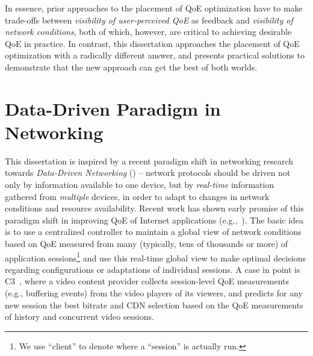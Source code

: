 \begin{itemize}
\end{itemize}

In essence, prior approaches to the placement of QoE optimization have to 
make trade-offs between
{\em visibility of user-perceived QoE} as feedback and {\em visibility of network conditions}, 
both of which, however, are critical to achieving desirable QoE in practice. 
In contrast, this dissertation approaches the placement of QoE optimization with a radically
different answer, and presents practical solutions to demonstrate that the new approach 
can get the best of both worlds.


\section{Data-Driven Paradigm in Networking}

This dissertation is inspired by a recent paradigm shift in networking research 
towards {\em Data-Driven Networking} ({\em \ddn}) -- network protocols should 
be driven not only by information available to one device, but by {\em real-time} 
information gathered from {\em multiple} devices, in order to adapt to changes 
in network conditions and resource availability.
Recent work has shown early promise of this paradigm shift in improving QoE of 
Internet applications (e.g.,~\cite{sigcomm12,footprint}).
The basic idea is to use a centralized controller to maintain a global view of 
network conditions based on QoE measured from many (typically, tens of 
thousands or more) of application sessions\footnote{We use ``client'' to denote 
where a ``session'' is actually run.} and use this real-time global view to make  
optimal decisions regarding configurations or adaptations of individual sessions.
A case in point is C3~\cite{c3}, where a video content provider 
collects session-level QoE measurements (e.g., buffering events) from 
the video players of its viewers, and predicts for any new session the best
bitrate and CDN selection based on the QoE measurements of 
history and concurrent video sessions.


